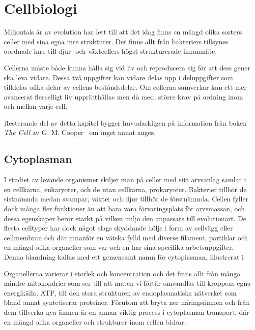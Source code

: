 \chapter{Cellbiologi}

Miljontals år av evolution har lett till att det idag finns en mängd olika sorters celler med sina egna inre strukturer. Det finns allt från bakteriers tillsynes oordnade inre till djur- och växtcellers högst strukturerade innanmäte. 

Cellerna måste både kunna hålla sig vid liv och reproducera sig för att dess gener ska leva vidare. Dessa två uppgifter kan vidare delas upp i deluppgifter som tilldelas olika delar av cellens beståndsdelar. Om cellerna samverkar kan ett mer avancerat flercelligt liv upprätthållas men då med, större krav på ordning inom och mellan varje cell.

Resterande del av detta kapitel bygger huvudaskligen på information från boken \emph{The Cell} av G. M.  Cooper~\cite{Cooper_TheCell2000} om inget annat anges.


\section{Cytoplasman}
I studiet av levande organismer skiljer man på celler med sitt arvsanlag samlat i en cellkärna, eukaryoter, och de utan cellkärna, prokaryoter. Bakterier tillhör de sistnämnda medan svampar, växter och djur tillhör de förstnämnda. Cellen fyller dock många fler funktioner än att bara vara förvaringsplats för arvsmassan, och dessa egenskaper beror starkt på vilken miljö den anpassats till evolutionärt. De flesta celltyper har dock något slags skyddande hölje i form av cellvägg eller cellmembran och där innanför en vätska fylld med diverse filament, partiklar och en mängd olika organeller som var och en har sina specifika arbetsuppgifter. Denna blandning kallas med ett gemensamt namn för cytoplasman, illustrerat i 

Organellerna varierar i storlek och koncentration och det finns allt från många mindre mitokondrier som ser till att maten vi förtär omvandlas till kroppens egna energikälla, ATP, till den stora strukturen av endoplasmatiska nätverket som bland annat syntetiserar proteiner. Förutom att bryta ner näringsämnen och från dem tillverka nya ämnen är en annan viktig process i cytoplasman transport, där en mängd olika organeller och strukturer inom cellen bidrar.



